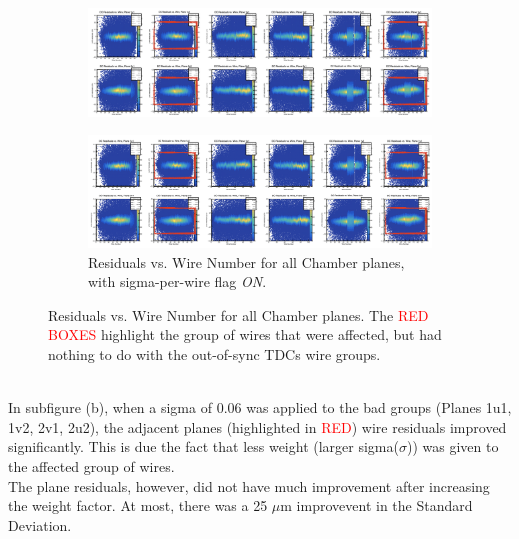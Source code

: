 \documentclass[11pt]{article}
\begin{document}
\begin{figure}[h!]
\centering
\begin{subfigure}{.5\textwidth}
  \hspace*{-5cm}                                                           
  \centering
  \includegraphics[width=2.1\linewidth]{2d_residuals_flagOFF.png}
  \label{fig:2d_res_flagOff}
\end{subfigure}%

\begin{subfigure}{.5\textwidth}
\hspace*{-5cm}                                                           
  \centering
  \includegraphics[width=2.1\linewidth]{2d_residuals_flagON.png}
  \caption{Residuals vs. Wire Number for all Chamber planes, with sigma-per-wire flag \textit{ON}.}
  \label{fig:2d_res_flagON}
\end{subfigure}
\caption{Residuals vs. Wire Number for all Chamber planes. The \textcolor{red}{RED BOXES} highlight the group of wires that were affected, but had nothing to do with the
  out-of-sync TDCs wire groups.}
\label{fig:wire_residuals_flag}
\end{figure}\\
In subfigure (b), when a sigma of 0.06 was applied to the bad groups (Planes 1u1, 1v2, 2v1, 2u2), the adjacent planes (highlighted in \textcolor{red}{RED})
wire residuals improved significantly. This is due the fact that less weight (larger sigma($\sigma$)) was given to the affected group of wires. \\
\newpage
The plane residuals, however, did not have much improvement after increasing the weight factor. At most, there was a 25 $\mu$m improvevent in the Standard Deviation.
\end{document}
